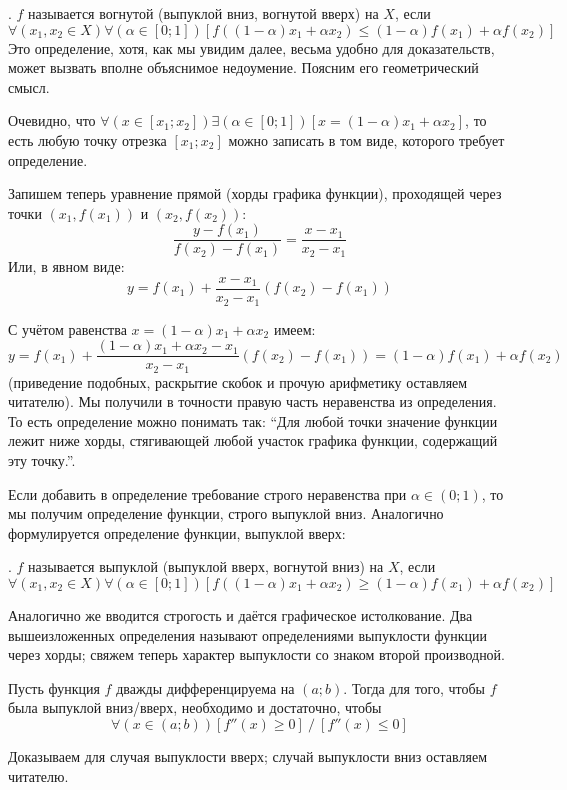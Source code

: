 \opred
\fXR. $f$ называется вогнутой (выпуклой вниз, вогнутой вверх) на $X$, если
$$
\forall(x_1,x_2 \in X)\forall(\alpha\in[0;1])
[f((1-\alpha)x_1+\alpha x_2) \leq (1-\alpha)f(x_1)+\alpha f(x_2)]
$$
Это определение, хотя, как мы увидим далее, весьма удобно для доказательств, может вызвать вполне объяснимое недоумение.
Поясним его геометрический смысл.

Очевидно, что $\forall(x\in[x_1;x_2])\exists(\alpha\in[0;1])[x=(1-\alpha)x_1+\alpha x_2]$, то есть любую точку отрезка $[x_1;x_2]$ можно записать в том виде, которого требует определение.

Запишем теперь уравнение прямой (хорды графика функции), проходящей через точки $(x_1,f(x_1))$ и $(x_2,f(x_2))$:
$$
\frac{y-f(x_1)}{f(x_2)-f(x_1)}=\frac{x-x_1}{x_2-x_1}
$$
Или, в явном виде:
$$
y=f(x_1)+\frac{x-x_1}{x_2-x_1}(f(x_2)-f(x_1))
$$

С учётом равенства $x=(1-\alpha)x_1+\alpha x_2$ имеем:
$$
y=f(x_1)+\frac{(1-\alpha)x_1+\alpha x_2-x_1}{x_2-x_1}(f(x_2)-f(x_1))=(1-\alpha)f(x_1)+\alpha f(x_2)
$$
(приведение подобных, раскрытие скобок и прочую арифметику оставляем читателю).
Мы получили в точности правую часть неравенства из определения.
То есть определение можно понимать так: ``Для любой точки значение функции лежит ниже хорды, стягивающей любой участок графика функции, содержащий эту точку.''.

Если добавить в определение требование строго неравенства при $\alpha\in(0;1)$, то мы получим определение функции, строго выпуклой вниз.
Аналогично формулируется определение функции, выпуклой вверх:

\opred
\fXR. $f$ называется выпуклой (выпуклой вверх, вогнутой вниз) на $X$, если
$$
\forall(x_1,x_2 \in X)\forall(\alpha\in[0;1])
[f((1-\alpha)x_1+\alpha x_2) \geq (1-\alpha)f(x_1)+\alpha f(x_2)]
$$

Аналогично же вводится строгость и даётся графическое истолкование. Два вышеизложенных определения называют определениями выпуклости функции через хорды; свяжем теперь характер выпуклости со знаком второй производной.

\begin{teorema}\label{vypukl_th_1}
Пусть функция $f$ дважды дифференцируема на $(a;b)$. Тогда для того, чтобы $f$ была выпуклой вниз/вверх, необходимо и достаточно, чтобы
$$
\forall(x\in(a;b))[f''(x)\geq 0]~/~[f''(x)\leq 0]
$$
\end{teorema}

\dokvo
Доказываем для случая выпуклости вверх; случай выпуклости вниз оставляем читателю.

